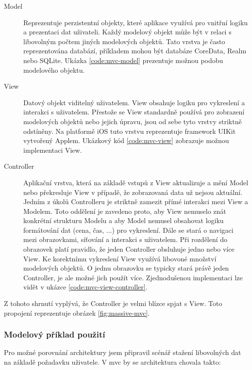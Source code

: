 \begin{description}
  \item[Model] Reprezentuje perzistentní objekty, které aplikace využívá pro vnitřní logiku a prezentaci dat uživateli.
  Každý modelový objekt může být v relaci s libovolným počtem jiných modelových objektů.
  Tato vrstva je často reprezentována databází, příkladem mohou být databáze CoreData, Realm nebo SQLite.
  Ukázka \ref{code:mvc-model} prezentuje možnou podobu modelového objektu.

  \item[View] Datový objekt viditelný uživatelem. View obsahuje logiku pro vykreslení a interakci s uživatelem.
  Přestože se View standardně používá pro zobrazení modelových objektů nebo jejich úpravu, jsou od sebe tyto vrstvy striktně odstíněny.
  Na platformě iOS tuto vrstvu reprezentuje framework UIKit vytvořený Applem.
  Ukázkový kód \ref{code:mvc-view} zobrazuje možnou implementaci View.

  \item[Controller] Aplikační vrstva, která na základě vstupů z View aktualizuje a mění Model nebo překresluje View v případě, že zobrazovaná data už nejsou aktuální.
  Jedním z úkolů Controlleru je striktně zamezit přímé interakci mezi View a Modelem.
  Toto oddělení je zavedeno proto, aby View nemuselo znát konkrétní strukturu Modelu a aby Model nemusel obsahovat logiku formátování dat (cena, čas, ...) pro vykreslení.
  Dále se stará o navigaci mezi obrazovkami, síťování a interakci s uživatelem.
  Při rozdělení do obrazovek platí pravidlo, že jeden Controller obsluhuje jedno nebo více View.
  Ke korektnímu vykreslení View využívá libovoné množství modelových objektů.
  O jednu obrazovku se typicky stará právě jeden Controller, je ale možné jich použít více.
  Zjednodušenou implementaci lze vidět v ukázce \ref{code:mvc-view-controller}.
\end{description}

Z tohoto shrnutí vyplývá, že Controller je velmi blízce spjat s View. Toto propojení reprezentuje obrázek \ref{fig:massive-mvc}.

\subsubsection*{Modelový příklad použití}

Pro možné porovnání architektury jsem připravil scénář stažení libovolných dat na základě požadavku uživatele.
V \acrshort{mvc} by se architektura chovala takto:

